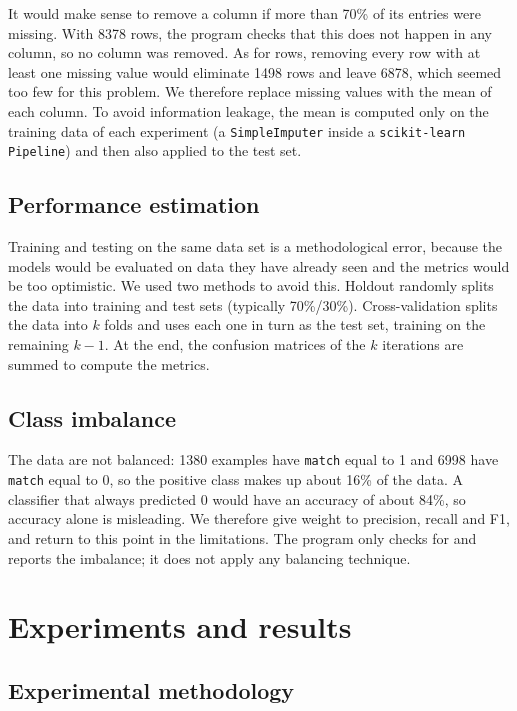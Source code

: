 \documentclass[12pt,a4paper]{article}
\newcommand{\code}[1]{\texttt{#1}}
\begin{document}
It would make sense to remove a column if more than 70\% of its entries were missing. With 8378 rows, the program checks that this does not happen in any column, so no column was removed. As for rows, removing every row with at least one missing value would eliminate 1498 rows and leave 6878, which seemed too few for this problem. We therefore replace missing values with the mean of each column. To avoid information leakage, the mean is computed only on the training data of each experiment (a \code{SimpleImputer} inside a \code{scikit-learn} \code{Pipeline}) and then also applied to the test set.

\subsection{Performance estimation}

Training and testing on the same data set is a methodological error, because the models would be evaluated on data they have already seen and the metrics would be too optimistic. We used two methods to avoid this. Holdout randomly splits the data into training and test sets (typically 70\%/30\%). Cross-validation splits the data into $k$ folds and uses each one in turn as the test set, training on the remaining $k-1$. At the end, the confusion matrices of the $k$ iterations are summed to compute the metrics.

\subsection{Class imbalance}

The data are not balanced: 1380 examples have \code{match} equal to 1 and 6998 have \code{match} equal to 0, so the positive class makes up about 16\% of the data. A classifier that always predicted 0 would have an accuracy of about 84\%, so accuracy alone is misleading. We therefore give weight to precision, recall and F1, and return to this point in the limitations. The program only checks for and reports the imbalance; it does not apply any balancing technique.

\clearpage
\section{Experiments and results}

\subsection{Experimental methodology}
\end{document}
